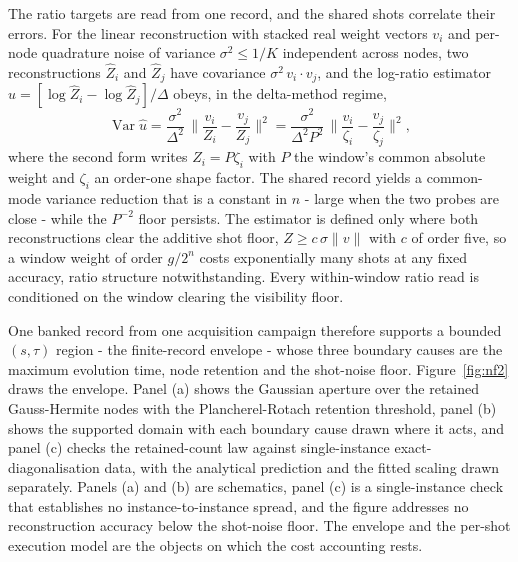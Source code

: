 The ratio targets are read from one record, and the shared shots correlate their errors. For the linear reconstruction with stacked real weight vectors $v_i$ and per-node quadrature noise of variance $\sigma^2 \le 1/K$ independent across nodes, two reconstructions $\widehat Z_i$ and $\widehat Z_j$ have covariance $\sigma^2\, v_i \cdot v_j$, and the log-ratio estimator $\widehat u = [\log\widehat Z_i - \log\widehat Z_j]/\Delta$ obeys, in the delta-method regime,
\begin{equation}\label{irf:shared-bank-ratio-boundary}
\operatorname{Var}\widehat u
= \frac{\sigma^2}{\Delta^2}\,\bigg\|\frac{v_i}{Z_i} - \frac{v_j}{Z_j}\bigg\|^2
= \frac{\sigma^2}{\Delta^2 P^2}\,\bigg\|\frac{v_i}{\zeta_i} - \frac{v_j}{\zeta_j}\bigg\|^2 ,
\end{equation}
where the second form writes $Z_i = P\zeta_i$ with $P$ the window's common absolute weight and $\zeta_i$ an order-one shape factor. The shared record yields a common-mode variance reduction that is a constant in $n$ - large when the two probes are close - while the $P^{-2}$ floor persists. The estimator is defined only where both reconstructions clear the additive shot floor, $Z \ge c\,\sigma\|v\|$ with $c$ of order five, so a window weight of order $g/2^n$ costs exponentially many shots at any fixed accuracy, ratio structure notwithstanding. Every within-window ratio read is conditioned on the window clearing the visibility floor.

One banked record from one acquisition campaign therefore supports a bounded $(s, \tau)$ region - the finite-record envelope - whose three boundary causes are the maximum evolution time, node retention and the shot-noise floor. Figure~\ref{fig:nf2} draws the envelope. Panel (a) shows the Gaussian aperture over the retained Gauss-Hermite nodes with the Plancherel-Rotach retention threshold, panel (b) shows the supported domain with each boundary cause drawn where it acts, and panel (c) checks the retained-count law against single-instance exact-diagonalisation data, with the analytical prediction and the fitted scaling drawn separately. Panels (a) and (b) are schematics, panel (c) is a single-instance check that establishes no instance-to-instance spread, and the figure addresses no reconstruction accuracy below the shot-noise floor. The envelope and the per-shot execution model are the objects on which the cost accounting rests.
